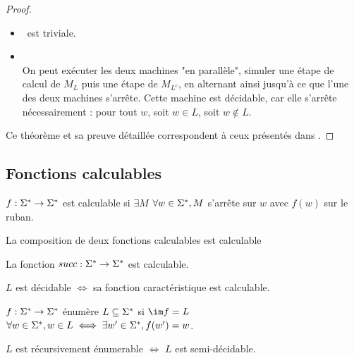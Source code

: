 \begin{proof}
	\begin{itemize}
		\item \bimpLR \ est triviale.
		\item \bimpRL \\
		      On peut exécuter les deux machines "en parallèle", \cad simuler une étape de calcul de $M_L$ puis une
		      étape de $M_{L^c}$, en alternant ainsi jusqu'à ce que l'une des deux machines s'arrête. Cette machine
		      est décidable, car elle s'arrête nécessairement : pour tout $w$, soit $w \in L$, soit $w \notin L$.
	\end{itemize}
	Ce théorème et sa preuve détaillée correspondent à ceux présentés dans \cite[Theorem~4.22]{sipser}.
\end{proof}

\subsection{Fonctions calculables}

\begin{definition}
	$f : \Sigma^{*} \to \Sigma^{*}$ est calculable si $\exists M$ \tq $\forall w \in \Sigma^{*}, M$ s'arrête sur $w$ avec $f(w)$ sur le ruban.
\end{definition}

\begin{lemma}
	La composition de deux fonctions calculables est calculable
\end{lemma}

\begin{lemma}
	La fonction $succ : \Sigma^{*} \to \Sigma^{*}$ est calculable.
\end{lemma}

\begin{prop}
	$L$ est décidable $\iff$ sa fonction caractéristique est calculable.
\end{prop}

\begin{definition}
	$f : \Sigma^{*} \to \Sigma^{*}$ énumère $L \subseteq \Sigma^{*}$ si $\im f = L$ \ie $\forall w \in \Sigma^{*}, w \in L \iff \exists w' \in \Sigma^{*}, f (w') = w$.
\end{definition}

\begin{prop}
	$L$ est récursivement énumerable $\iff$ $L$ est semi-décidable.
\end{prop}

